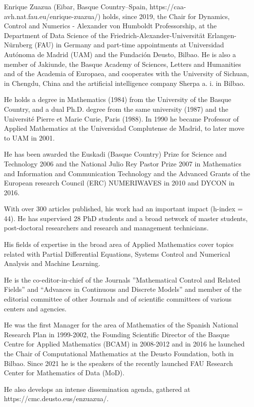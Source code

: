 \documentclass[journal,twoside,web]{ieeecolor}
\begin{document}
\begin{IEEEbiography}{Enrique Zuazua} (Eibar, Basque Country–Spain, https://caa-avh.nat.fau.eu/enrique-zuazua/)  holds, since 2019, the Chair for Dynamics, Control and Numerics - Alexander von Humboldt Professorship, at the Department of Data Science of the Friedrich-Alexander-Universität Erlangen-Nürnberg (FAU) in Germany and part-time appointments at Universidad Autónoma de Madrid (UAM) and the Fundación Deusto, Bilbao. He is also a member of Jakiunde, the Basque Academy of Sciences, Letters and Humanities and of the Academia of Europaea, and  cooperates with the University of Sichuan, in Chengdu, China and the artificial intelligence company Sherpa a. i. in Bilbao.

He holds a degree in Mathematics (1984) from the University of the Basque Country, and a dual Ph.D. degree from the same university (1987) and the Université Pierre et Marie Curie, Paris (1988). In 1990 he became Professor of Applied Mathematics at the Universidad Complutense de Madrid, to later move to UAM in 2001. 

He has been awarded the Euskadi (Basque Country) Prize for Science and Technology 2006 and the National Julio Rey Pastor Prize 2007 in Mathematics and Information and Communication Technology and the Advanced Grants of the European research Council (ERC) NUMERIWAVES in 2010 and DYCON in 2016. 

With over 300 articles published, his work had an important impact (h-index = 44). He has supervised 28 PhD students and a broad network of master students, post-doctoral researchers and research and management technicians. 

His fields of expertise in the broad area of Applied Mathematics cover topics related with Partial Differential Equations, Systems Control and Numerical Analysis and Machine Learning.

He is the co-editor-in-chief of the Journals ”Mathematical Control and Related Fields” and “Advances in Continuous and Discrete Models” and member of the editorial committee of other Journals and of scientific committees of various centers and agencies. 

He was the first Manager for the area of Mathematics of the Spanish National Research Plan in 1999-2002,  the Founding Scientific Director of the Basque Centre for Applied Mathematics (BCAM) in 2008-2012 and in 2016 he launched the Chair of Computational Mathematics at the Deusto Foundation, both in Bilbao.  Since 2021 he is the speakers of the recently launched FAU Research Center for Mathematics of Data (MoD).

He also  develops an intense dissemination agenda, gathered at https://cmc.deusto.eus/enzuazua/.
\end{IEEEbiography}
\end{document}
